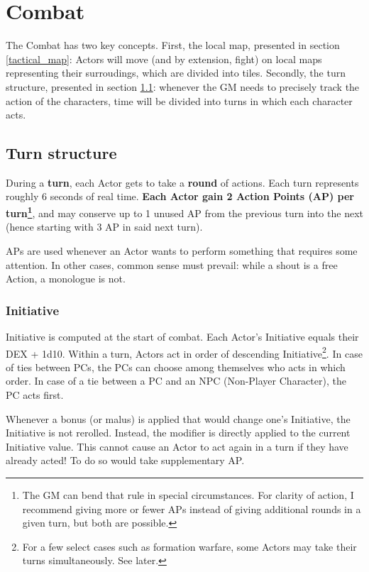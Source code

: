 \chapter{Combat}

The Combat has two key concepts. First, the local map, presented in section \ref{tactical_map}: Actors will move (and by extension, fight) on local maps representing their surroudings, which are divided into tiles. Secondly, the turn structure, presented in section \ref{turn_structure}: whenever the GM needs to precisely track the action of the characters, time will be divided into turns in which each character acts. 

\section{Turn structure}

\label{turn_structure}

During a \textbf{turn}, each Actor gets to take a \textbf{round} of actions. Each turn represents roughly 6 seconds of real time. \textbf{Each Actor gain 2 Action Points (AP) per turn\footnote{The GM can bend that rule in special circumstances. For clarity of action, I recommend giving more or fewer APs instead of giving additional rounds in a given turn, but both are possible.}}, and may conserve up to 1 unused AP from the previous turn into the next (hence starting with 3 AP in said next turn). 

APs are used whenever an Actor wants to perform something that requires some attention. In other cases, common sense must prevail: while a shout is a free Action, a monologue is not.

\subsection{Initiative} 

Initiative is computed at the start of combat. Each Actor's Initiative equals their DEX + 1d10. Within a turn, Actors act in order of descending Initiative\footnote{For a few select cases such as formation warfare, some Actors may take their turns simultaneously. See later.}. In case of ties between PCs, the PCs can choose among themselves who acts in which order. In case of a tie between a PC and an NPC (Non-Player Character), the PC acts first.

Whenever a bonus (or malus) is applied that would change one's Initiative, the Initiative is not rerolled. Instead, the modifier is directly applied to the current Initiative value. This cannot cause an Actor to act again in a turn if they have already acted! To do so would take supplementary AP.


